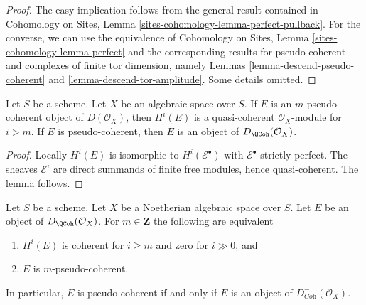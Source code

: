 \begin{proof}
The easy implication follows from the general result contained in
Cohomology on Sites, Lemma \ref{sites-cohomology-lemma-perfect-pullback}.
For the converse, we can use the equivalence of
Cohomology on Sites, Lemma \ref{sites-cohomology-lemma-perfect}
and the corresponding results for pseudo-coherent and complexes of
finite tor dimension, namely
Lemmas \ref{lemma-descend-pseudo-coherent} and
\ref{lemma-descend-tor-amplitude}.
Some details omitted.
\end{proof}

\begin{lemma}
\label{lemma-pseudo-coherent}
Let $S$ be a scheme. Let $X$ be an algebraic space over $S$.
If $E$ is an $m$-pseudo-coherent object of $D(\mathcal{O}_X)$,
then $H^i(E)$ is a quasi-coherent $\mathcal{O}_X$-module for $i > m$.
If $E$ is pseudo-coherent, then $E$ is an object of
$D_\QCoh(\mathcal{O}_X)$.
\end{lemma}

\begin{proof}
Locally $H^i(E)$ is isomorphic to $H^i(\mathcal{E}^\bullet)$
with $\mathcal{E}^\bullet$ strictly perfect. The sheaves
$\mathcal{E}^i$ are direct summands of finite free modules,
hence quasi-coherent. The lemma follows.
\end{proof}

\begin{lemma}
\label{lemma-identify-pseudo-coherent-noetherian}
Let $S$ be a scheme. Let $X$ be a Noetherian algebraic space over $S$.
Let $E$ be an object of $D_\QCoh(\mathcal{O}_X)$. For
$m \in \mathbf{Z}$ the following are equivalent
\begin{enumerate}
\item $H^i(E)$ is coherent for $i \geq m$ and zero for $i \gg 0$, and
\item $E$ is $m$-pseudo-coherent.
\end{enumerate}
In particular, $E$ is pseudo-coherent if and only if $E$ is an object
of $D^-_{\textit{Coh}}(\mathcal{O}_X)$.
\end{lemma}

